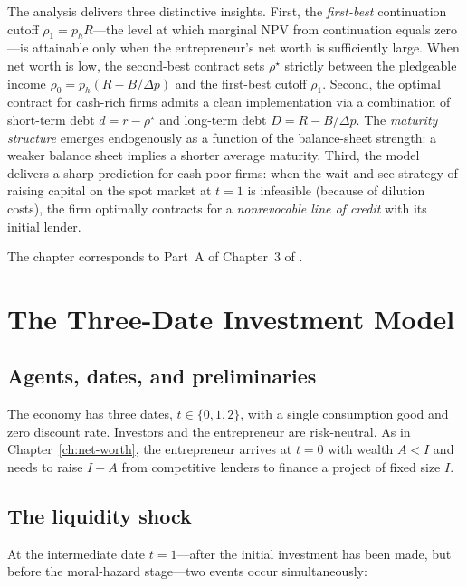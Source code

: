 \documentclass[11pt,a4paper,oneside]{book}
\theoremstyle{plain}
\theoremstyle{definition}
\theoremstyle{remark}
\numberwithin{equation}{chapter}
\begin{document}
The analysis delivers three distinctive insights.
First, the \emph{first-best} continuation cutoff $\rho_1 = p_h R$---the level at which marginal NPV from continuation equals zero---is attainable only when the entrepreneur's net worth is sufficiently large.
When net worth is low, the second-best contract sets $\rho^\star$ strictly between the pledgeable income $\rho_0 = p_h(R - B/\Delta p)$ and the first-best cutoff $\rho_1$.
Second, the optimal contract for cash-rich firms admits a clean implementation via a combination of short-term debt $d = r - \rho^\star$ and long-term debt $D = R - B/\Delta p$.
The \emph{maturity structure} emerges endogenously as a function of the balance-sheet strength: a weaker balance sheet implies a shorter average maturity.
Third, the model delivers a sharp prediction for cash-poor firms: when the wait-and-see strategy of raising capital on the spot market at $t=1$ is infeasible (because of dilution costs), the firm optimally contracts for a \emph{nonrevocable line of credit} with its initial lender.

The chapter corresponds to Part~A of Chapter~3 of \citet{Tirole2006}.

\section{The Three-Date Investment Model}
\label{sec:ML-model}

\subsection{Agents, dates, and preliminaries}

The economy has three dates, $t \in \{0, 1, 2\}$, with a single consumption good and zero discount rate.
Investors and the entrepreneur are risk-neutral.
As in Chapter~\ref{ch:net-worth}, the entrepreneur arrives at $t=0$ with wealth $A < I$ and needs to raise $I - A$ from competitive lenders to finance a project of fixed size $I$.

\subsection{The liquidity shock}

At the intermediate date $t=1$---after the initial investment has been made, but before the moral-hazard stage---two events occur simultaneously:
\end{document}
